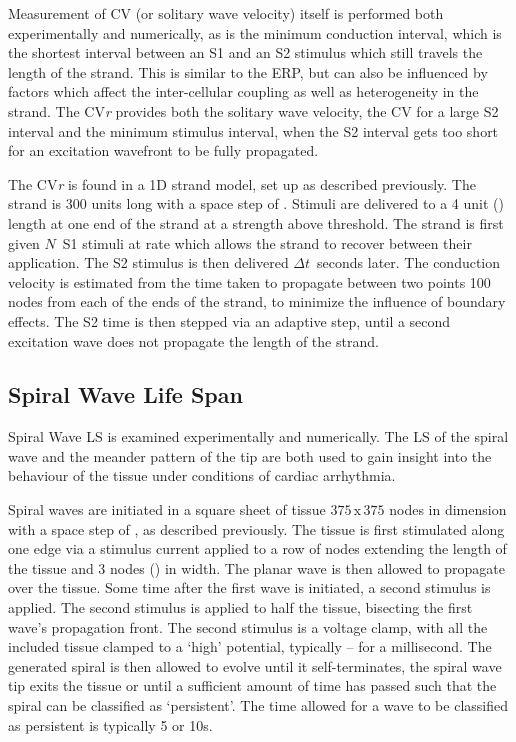 Measurement of CV (or solitary wave velocity) itself is performed both
experimentally and numerically, as is the minimum conduction interval, which is
the shortest interval between an S1 and an S2 stimulus which still travels the
length of the strand.  This is similar to the ERP, but can also be influenced by
factors which affect the inter-cellular coupling as well as heterogeneity in the
strand.  The CV\emph{r} provides both the solitary wave velocity, the CV for a large S2
interval and the minimum stimulus interval, when the S2 interval gets too short
for an excitation wavefront to be fully propagated.

The CV\emph{r} is found in a 1D strand model, set up as described previously.
The strand is 300 units long with a space step of .  Stimuli are
delivered to a 4 unit () length at one end of the strand at a strength
above threshold.  The strand is first given $N$\ S1 stimuli at rate which allows
the strand to recover between their application.  The S2 stimulus is then
delivered $\Delta t$\ seconds later. The conduction velocity is estimated from
the time taken to propagate between two points 100 nodes from each of the ends
of the strand, to minimize the influence of boundary effects.  The S2 time is
then stepped via an adaptive step, until a second excitation wave does not
propagate the length of the strand.


\subsection{Spiral Wave Life Span}

Spiral Wave LS is examined experimentally and numerically.  The LS of the spiral
wave and the meander pattern of the tip are both used to gain insight into the
behaviour of the tissue under conditions of cardiac arrhythmia.

Spiral waves are initiated in a square sheet of tissue $375\,\text{x}\,375$
nodes in dimension with a space step of , as described previously.  The
tissue is first stimulated along one edge via a stimulus current applied to a
row of nodes extending the length of the tissue and 3 nodes () in width.
The planar wave is then allowed to propagate over the tissue.  Some time after
the first wave is initiated, a second stimulus is applied.  The second stimulus
is applied to half the tissue, bisecting the first wave's propagation front.
The second stimulus is a voltage clamp, with all the included tissue clamped to
a `high' potential, typically -- for a millisecond.  The
generated spiral is then allowed to evolve until it self-terminates, the spiral
wave tip exits the tissue or until a sufficient amount of time has passed such
that the spiral can be classified as `persistent'.  The time allowed for a wave
to be classified as persistent is typically 5 or \unit{10}{s}.

